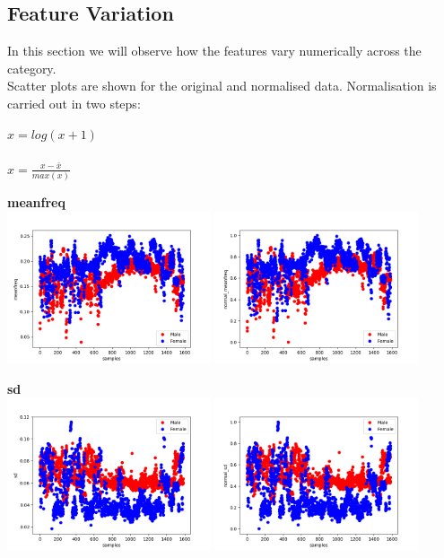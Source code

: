 \documentclass[12pt]{article}
\begin{document}
		\subsection{Feature Variation}
		\begin{justify}
			\textnormal{In this section we will observe how the features vary numerically across the category.\\Scatter plots are shown for the original and normalised data. Normalisation is carried out in two steps: \\}
			\begin{center}
				$ x = log(x + 1) $\\
				\textnormal{\\}
				$ x = \frac{x - \bar{x}}{max(x)} $
			\end{center}
			\textbf{meanfreq}\\
				\includegraphics[width=6cm]{../Graphs2/meanfreq}
				\includegraphics[width=6cm]{../Graphs2/norm_meanfreq}
				
			\textbf{sd}\\
				\includegraphics[width=6cm]{../Graphs2/sd}
				\includegraphics[width=6cm]{../Graphs2/norm_sd}
				

\end{justify}
\end{document}
